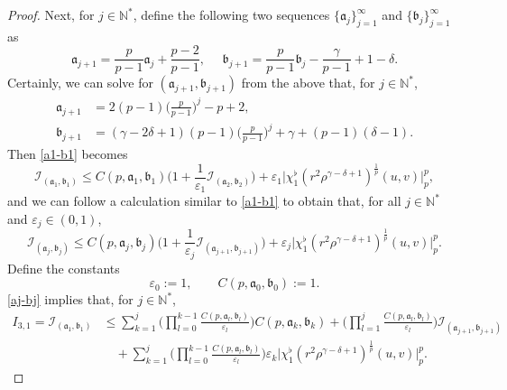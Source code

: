 \documentclass[11pt,reqno]{amsart}
\numberwithin{rk}{section}
\numberwithin{prop}{section}
\numberwithin{mydef}{section}
\numberwithin{lem}{section}
\numberwithin{equation}{section}
\numberwithin{thm}{section}
\begin{document}
\begin{proof}
Next, for $j\in \mathbb{N}^*$, define the following two sequences $\{\mathfrak{a}_j\}_{j=1}^\infty$ and $\{\mathfrak{b}_j\}_{j=1}^\infty$ 
as
\begin{equation*}
\mathfrak{a}_{j+1}=\frac{p}{p-1}\mathfrak{a}_j+\frac{p-2}{p-1},\quad\,\, \mathfrak{b}_{j+1}=\frac{p}{p-1}\mathfrak{b}_j-\frac{\gamma}{p-1}+1-\delta.
\end{equation*}
Certainly, we can solve for $(\mathfrak{a}_{j+1},\mathfrak{b}_{j+1})$ from the above that, for $j\in \mathbb{N}^*$,
\begin{equation}\label{tongxiang}
\begin{aligned}
\mathfrak{a}_{j+1}&=2(p-1)\big(\frac{p}{p-1}\big)^{j}-p+2,\\
\mathfrak{b}_{j+1}&=(\gamma-2\delta+1)(p-1)\big(\frac{p}{p-1}\big)^{j}+\gamma+(p-1)(\delta-1).    
\end{aligned}
\end{equation}
Then \eqref{a1-b1} becomes
\begin{equation*}
\mathcal{I}_{(\mathfrak{a}_1,\mathfrak{b}_1)}\leq C(p,\mathfrak{a}_1,\mathfrak{b}_1)\Big(1+\frac{1}{\varepsilon_1}\mathcal{I}_{(\mathfrak{a}_2,\mathfrak{b}_2)}\Big)+\varepsilon_1 \big|\chi_1^\flat(r^2\rho^{\gamma-\delta+1})^\frac{1}{p}(u,v)\big|_{p}^{p},
\end{equation*}
and we can follow a calculation similar to \eqref{a1-b1} to obtain that,
for all $j\in \mathbb{N}^*$ and $\varepsilon_j\in (0,1)$,
\begin{equation}\label{aj-bj}
\mathcal{I}_{(\mathfrak{a}_j,\mathfrak{b}_j)}\leq C(p,\mathfrak{a}_j,\mathfrak{b}_j)\Big(1+\frac{1}{\varepsilon_j}\mathcal{I}_{(\mathfrak{a}_{j+1},\mathfrak{b}_{j+1})}\Big)+\varepsilon_j \big|\chi_1^\flat(r^2\rho^{\gamma-\delta+1})^\frac{1}{p}(u,v)\big|_{p}^{p}.
\end{equation}
Define the constants
\begin{equation*}
\varepsilon_0:=1,\qquad C(p,\mathfrak{a}_0,\mathfrak{b}_0):=1.
\end{equation*}
\eqref{aj-bj} implies that, for $j\in \mathbb{N}^*$,
\begin{equation}\label{g11-po}
\begin{aligned}
I_{3,1}=\mathcal{I}_{(\mathfrak{a}_1,\mathfrak{b}_1)}
&\leq \sum_{k=1}^j\Big(\prod_{l=0}^{k-1}\frac{C(p,\mathfrak{a}_l,\mathfrak{b}_l)}{\varepsilon_{l}}\Big)C(p,\mathfrak{a}_k,\mathfrak{b}_k)
+\Big(\prod_{l=1}^j \frac{C(p,\mathfrak{a}_l,\mathfrak{b}_l)}{\varepsilon_l}\Big)\mathcal{I}_{(\mathfrak{a}_{j+1},\mathfrak{b}_{j+1})}\\
&\quad + \sum_{k=1}^j\Big(\prod_{l=0}^{k-1}\frac{C(p,\mathfrak{a}_l,\mathfrak{b}_l)}{\varepsilon_l}\Big) \varepsilon_{k} \big|\chi_1^\flat(r^2\rho^{\gamma-\delta+1})^\frac{1}{p}(u,v)\big|_{p}^{p}.    
\end{aligned}    
\end{equation}



\end{proof}
\end{document}

